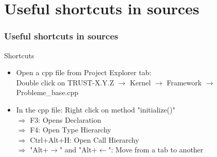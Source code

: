 \documentclass[10pt, hyperref={unicode=true,pdfusetitle, bookmarks=true,bookmarksnumbered=false,bookmarksopen=false, breaklinks=false,pdfborder={0 0 1},backref=true,colorlinks=true,linkcolor=darkblue,pageanchor, urlcolor=darkblue}]{beamer}
\begin{document}
\section{{\bf{Useful shortcuts in sources}}}
\begin{frame}
\tableofcontents[sections={1-5},currentsection, currentsubsection]
\end{frame}
\begin{frame}
\frametitle{Useful shortcuts in sources}

\begin{block}{Shortcuts}
\vspace{0.2cm}
\begin{itemize} 
\item Open a cpp file from Project Explorer tab: \\
  Double click on TRUST-X.Y.Z $\rightarrow$ Kernel $\rightarrow$ Framework $\rightarrow$ Probleme\_base.cpp \\ \vspace{0.2cm}
\item In the cpp file: Right click on method "initialize()" \\
  $\Rightarrow$ F3: Opens Declaration \\
  $\Rightarrow$ F4: Open Type Hierarchy \\
  $\Rightarrow$ Ctrl+Alt+H: Open Call Hierarchy \\
  $\Rightarrow$ "Alt+$\rightarrow$" and "Alt+$\leftarrow$": Move from a tab to another
\end{itemize}
\end{block}

\end{frame}
\end{document}
